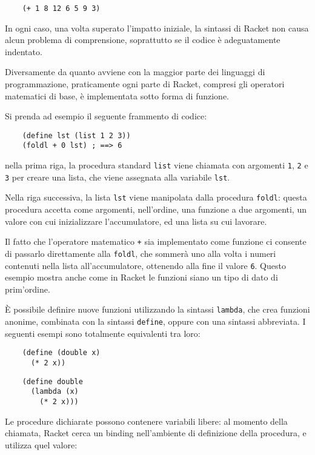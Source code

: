 \begin{lstlisting}
    (+ 1 8 12 6 5 9 3)
\end{lstlisting}

In ogni caso, una volta superato l'impatto iniziale, la sintassi di
Racket non causa alcun problema di comprensione, soprattutto se il
codice \`e adeguatamente indentato.

Diversamente da quanto avviene con la maggior parte dei linguaggi di
programmazione, praticamente ogni parte di Racket, compresi gli operatori
matematici di base, \`e implementata sotto forma di funzione.

Si prenda ad esempio il seguente frammento di codice:

\begin{lstlisting}
    (define lst (list 1 2 3))
    (foldl + 0 lst) ; ==> 6
\end{lstlisting}

nella prima riga, la procedura standard \lstinline{list} viene chiamata
con argomenti \lstinline{1}, \lstinline{2} e \lstinline{3} per creare una
lista, che viene assegnata alla variabile \lstinline{lst}.

Nella riga successiva, la lista \lstinline{lst} viene manipolata dalla
procedura \lstinline{foldl}: questa procedura accetta come argomenti,
nell'ordine, una funzione a due argomenti, un valore con cui
inizializzare l'accumulatore, ed una lista su cui lavorare.

Il fatto che l'operatore matematico \lstinline{+} sia implementato come
funzione ci consente di passarlo direttamente alla \lstinline{foldl}, che
sommer\`a uno alla volta i numeri contenuti nella lista all'accumulatore,
ottenendo alla fine il valore \lstinline{6}. Questo esempio mostra anche
come in Racket le funzioni siano un tipo di dato di prim'ordine.

\`E possibile definire nuove funzioni utilizzando la sintassi
\lstinline{lambda}, che crea funzioni anonime, combinata con la sintassi
\lstinline{define}, oppure con una sintassi abbreviata. I seguenti esempi
sono totalmente equivalenti tra loro:

\begin{lstlisting}
    (define (double x)
      (* 2 x))
\end{lstlisting}

\begin{lstlisting}
    (define double
      (lambda (x)
        (* 2 x)))
\end{lstlisting}

Le procedure dichiarate possono contenere variabili libere: al momento
della chiamata, Racket cerca un binding nell'ambiente di definizione
della procedura, e utilizza quel valore:

